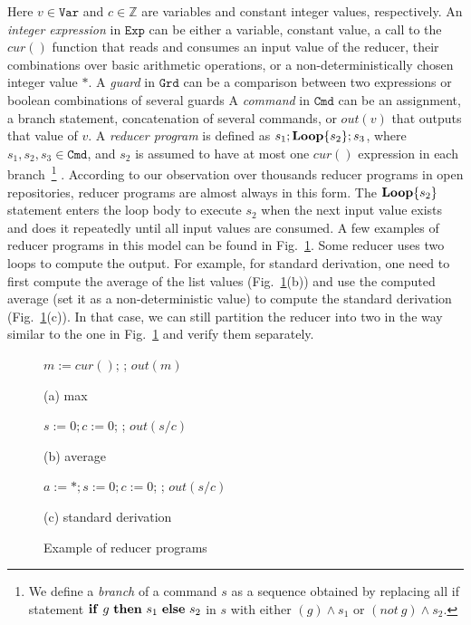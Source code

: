 \documentclass{llncs}
\newcommand{\Var}{\mathtt{Var}}
\newcommand{\Exp}{\mathtt{Exp}}
\newcommand{\Cmd}{\mathtt{Cmd}}
\newcommand{\Grd}{\mathtt{Grd}}
\newcommand{\cur}{cur()}
\newcommand{\ite}[3]{
	 \ifmmode 
	 \mathbf{if}\ #1 \ \mathbf{then}\ #2\  \mathbf{else}\ #3 
	 \else
	 \textbf{if}\ #1 \ \textbf{then}\ #2\  \textbf{else}\ #3
	 \fi}
\newcommand{\rloop}{
	\ifmmode 
	\mathbf{Loop}
	\else
	\textbf{Loop}
	\fi}
\newcommand{\Z}{\mathbb{Z}}
\begin{document}
Here $v\in \Var$ and $c \in \Z$ are variables and constant integer values, respectively. An \emph{integer expression} in $\Exp$ can be either a variable, constant value, a call to the $\cur$ function that reads and consumes an input value of the reducer, their combinations over basic arithmetic operations, or a non-deterministically chosen integer value $*$.
A \emph{guard} in $\Grd$ can be a comparison between two expressions or boolean combinations of several guards A \emph{command} in $\Cmd$ can be an assignment, a branch statement, concatenation of several commands, or $out(v)$ that outputs that value of $v$.
A \emph{reducer program} is defined as $s_1;\rloop\{s_2\};s_3$, where $s_1,s_2,s_3 \in \Cmd$, and $s_2$ is assumed to have at most one $\cur$ expression in each branch~\footnote{We define a \emph{branch} of a command $s$ as a sequence obtained by replacing all if statement $\ite{g}{s_1}{s_2}$ in $s$ with either $(g)\wedge s_1$ or $(not\ g) \wedge s_2$.} . According to our observation over thousands reducer programs in open repositories, reducer programs are almost always in this form. The $\rloop\{s_2\}$ statement enters the loop body to execute $s_2$ when the next input value exists and does it repeatedly until all input values are consumed. A few examples of reducer programs in this model can be found in Fig.~\ref{fig:reducer_example}. Some reducer uses two loops to compute the output. For example, for standard derivation, one need to first compute the average of the list values (Fig.~\ref{fig:reducer_example}(b)) and use the computed average (set it as a non-deterministic value) to compute the standard derivation (Fig.~\ref{fig:reducer_example}(c)). In that case, we can still partition the reducer into two in the way similar to the one in Fig.~\ref{fig:reducer_example} and verify them separately.




\begin{figure}
	\begin{minipage}{0.32\textwidth}
		\begin{algorithm}[H]
			$m := \cur$; \;
			\Loop{}{
				\uIf{ $\cur > m$}{
					$m := \cur$ 
				}
			};
			$out(m)$\;
		\end{algorithm}
		\caption*{(a) max}
	\end{minipage}	
	\begin{minipage}{0.3\textwidth}
		\begin{algorithm}[H]
			$s := 0;c:=0$; \;
			\Loop{}{
				$s := s+\cur$;\;
				$c := c+1$ 
			};
			$out(s/c)$\;\;
		\end{algorithm}
		\caption*{(b) average}
	\end{minipage}	
	\begin{minipage}{0.36\textwidth}
		\begin{algorithm}[H]
			$a:=*;s := 0; c:=0$;\;
			\Loop{}{
				$s := s+(\cur-a)^2$; \;
				$c := c+1$ 
			};
			$out(s/c)$
		\end{algorithm}
		\caption*{(c) standard derivation}
	\end{minipage}	
	\caption{Example of reducer programs}
	\label{fig:reducer_example}
\end{figure}
\end{document}
